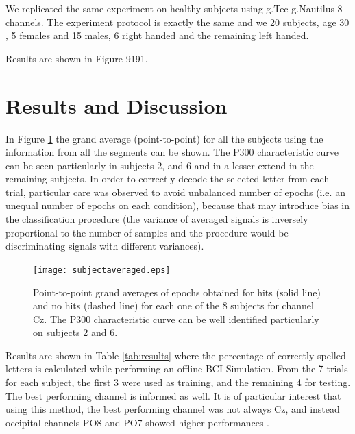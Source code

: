 \documentclass[entropy,article,submit,moreauthors,pdftex,10pt,a4paper]{mdpi}
\begin{document}
We replicated the same experiment on healthy subjects using g.Tec g.Nautilus 8 channels.  The experiment protocol is exactly the same and we 20 subjects, age $ 30$, 5 females and 15 males, 6 right handed and the remaining left handed. 

Results are shown in Figure 9191.

\section{Results and Discussion} \label{Results}
\label{section:results}
In Figure \ref{fig:subjectaveraged} the grand average (point-to-point) for all the subjects using the information from all the segments can be shown.  The P300 characteristic curve can be seen particularly in subjects 2, and 6 and in a lesser extend in the remaining subjects. In order to correctly decode the selected letter from each trial, particular care was observed to avoid unbalanced number of epochs  (i.e. an unequal number of epochs on each condition), because that may introduce bias in the classification procedure (the variance of averaged signals is inversely proportional to the number of samples and the procedure would be discriminating signals with different variances).  

\begin{figure}[H]
\centering
\texttt{[image: subjectaveraged.eps]}
\caption{Point-to-point grand averages of epochs obtained for hits (solid line) and no hits (dashed line) for each one of the 8 subjects for channel Cz. The P300 characteristic curve can be well identified particularly on subjects 2 and 6.}
\label{fig:subjectaveraged}
\end{figure}

Results are shown in Table \ref{tab:results} where the percentage of correctly spelled letters is calculated while performing an offline BCI Simulation.  From the 7 trials for each subject, the first 3 were used as training, and the remaining 4 for testing.  The best performing channel is informed as well.  It is of particular interest that using this method, the best performing channel was not always Cz, and instead occipital channels PO8 and PO7 showed higher performances \citep{Huggins2016,Jure2016}.
\end{document}
